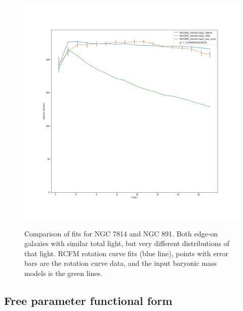 \documentclass[reprint,%
 amsmath,amssymb,
 aps,
]{revtex4-1}
\begin{document}
\begin{figure}
\begin{minipage}{.5\textwidth}
  \includegraphics[width=.95\linewidth]{figures/NGC0891_rotmod-Copy1_XueSofue.png}
  \label{fig:test1}
\end{minipage}
 \caption{Comparison of fits for NGC 7814 and NGC 891. Both edge-on galaxies with similar total light, but very different distributions of that light.     RCFM rotation curve fits (blue line), points with error bars are the rotation curve data, and the input baryonic mass models is  the green lines.  }
 \label{fitCompare7814_891}
\end{figure}
 
 
 
 
  

\subsection{Free parameter functional form }\label{FreeCorrel}
\end{document}
